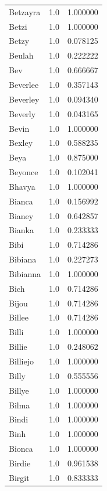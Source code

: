 \documentclass[
  letterpaper,
  DIV=11,
  numbers=noendperiod]{scrreprt}
\begin{document}
\begin{tabular}{lrr}
Betzayra        &   1.0 &   1.000000 \\
Betzi           &   1.0 &   1.000000 \\
Betzy           &   1.0 &   0.078125 \\
Beulah          &   1.0 &   0.222222 \\
Bev             &   1.0 &   0.666667 \\
Beverlee        &   1.0 &   0.357143 \\
Beverley        &   1.0 &   0.094340 \\
Beverly         &   1.0 &   0.043165 \\
Bevin           &   1.0 &   1.000000 \\
Bexley          &   1.0 &   0.588235 \\
Beya            &   1.0 &   0.875000 \\
Beyonce         &   1.0 &   0.102041 \\
Bhavya          &   1.0 &   1.000000 \\
Bianca          &   1.0 &   0.156992 \\
Bianey          &   1.0 &   0.642857 \\
Bianka          &   1.0 &   0.233333 \\
Bibi            &   1.0 &   0.714286 \\
Bibiana         &   1.0 &   0.227273 \\
Bibianna        &   1.0 &   1.000000 \\
Bich            &   1.0 &   0.714286 \\
Bijou           &   1.0 &   0.714286 \\
Billee          &   1.0 &   0.714286 \\
Billi           &   1.0 &   1.000000 \\
Billie          &   1.0 &   0.248062 \\
Billiejo        &   1.0 &   1.000000 \\
Billy           &   1.0 &   0.555556 \\
Billye          &   1.0 &   1.000000 \\
Bilma           &   1.0 &   1.000000 \\
Bindi           &   1.0 &   1.000000 \\
Binh            &   1.0 &   1.000000 \\
Bionca          &   1.0 &   1.000000 \\
Birdie          &   1.0 &   0.961538 \\
Birgit          &   1.0 &   0.833333 \\

\end{tabular}
\end{document}
